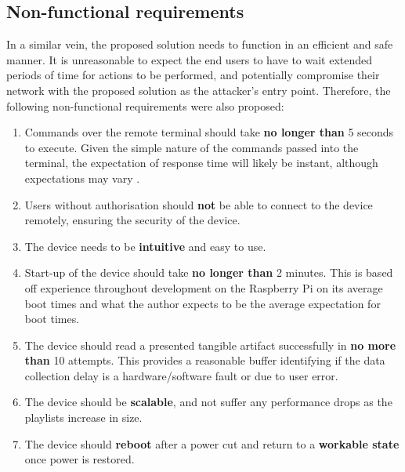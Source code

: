 \subsection{Non-functional requirements}\label{subsec:nonfuncreq}
In a similar vein, the proposed solution needs to function in an efficient and safe manner. It is unreasonable to expect the end users to have to wait extended periods of time for actions to be performed, and potentially compromise their network with the proposed solution as the attacker's entry point. Therefore, the following non-functional requirements were also proposed:
\begin{enumerate}
    \item\label{req:remoteTime} Commands over the remote terminal should take \textbf{no longer than} 5 seconds to execute. Given the simple nature of the commands passed into the terminal, the expectation of response time will likely be instant, although expectations may vary \citep{shneiderman1984response}.  
    \item\label{req:remoteAuth} Users without authorisation should \textbf{not} be able to connect to the device remotely, ensuring the security of the device.
    \item\label{req:easeofuse} The device needs to be \textbf{intuitive} and easy to use.
    \item\label{req:startupTime} Start-up of the device should take \textbf{no longer than} 2 minutes. This is based off experience throughout development on the Raspberry Pi on its average boot times and what the author expects to be the average expectation for boot times.
    \item\label{req:NFCtolerance} The device should read a presented tangible artifact successfully in \textbf{no more than} 10 attempts. This provides a reasonable buffer identifying if the data collection delay is a hardware/software fault or due to user error.
    \item\label{req:scalability} The device should be \textbf{scalable}, and not suffer any performance drops as the playlists increase in size.
    \item\label{req:reboot} The device should \textbf{reboot} after a power cut and return to a \textbf{workable state} once power is restored.
\end{enumerate}


